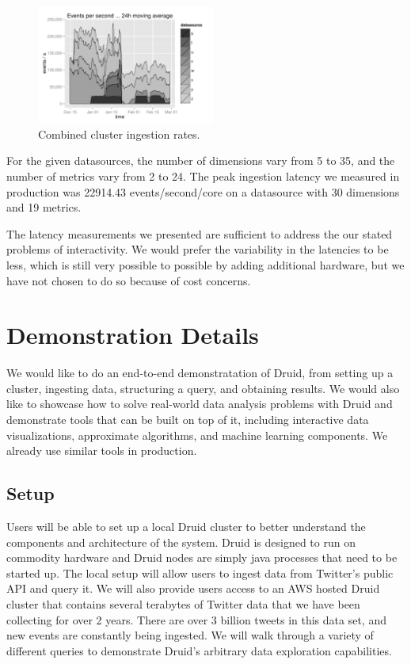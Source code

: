 \documentclass{vldb}
\begin{document}
\begin{figure}
\centering
\includegraphics[width = 2.3in]{ingestion_rate}
\caption{Combined cluster ingestion rates.}
\label{fig:ingestion_rate}
\end{figure}

For the given datasources, the number of dimensions vary from 5 to 35, and the
number of metrics vary from 2 to 24. The peak ingestion latency we measured in
production was 22914.43 events/second/core on a datasource with 30 dimensions
and 19 metrics.

The latency measurements we presented are sufficient to address the our stated
problems of interactivity. We would prefer the variability in the latencies to
be less, which is still very possible to possible by adding additional
hardware, but we have not chosen to do so because of cost concerns.

\section{Demonstration Details}

We would like to do an end-to-end demonstratation of Druid, from setting up a
cluster, ingesting data, structuring a query, and obtaining results. We would
also like to showcase how to solve real-world data analysis problems with Druid
and demonstrate tools that can be built on top of it, including interactive
data visualizations, approximate algorithms, and machine learning components.
We already use similar tools in production.

\subsection{Setup}

Users will be able to set up a local Druid cluster to better understand the
components and architecture of the system. Druid is designed to run on
commodity hardware and Druid nodes are simply java processes that need to be
started up. The local setup will allow users to ingest data from Twitter's
public API and query it.  We will also provide users access to an AWS hosted
Druid cluster that contains several terabytes of Twitter data that we have been
collecting for over 2 years. There are over 3 billion tweets in this data set,
and new events are constantly being ingested. We will walk through a variety of
different queries to demonstrate Druid's arbitrary data exploration
capabilities.
\end{document}
